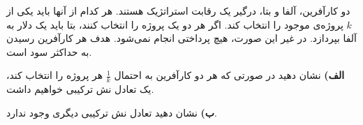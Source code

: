 دو کارآفرین، آلفا و بتا، درگیر یک رقابت استراتژیک هستند. هر کدام از آنها باید یکی از
$k$
پروژه‌ی موجود را انتخاب کند. اگر هر دو یک پروژه را انتخاب کنند، بتا باید یک دلار به آلفا بپردازد. در غیر این صورت، هیچ پرداختی انجام نمی‌شود. هدف هر کارآفرین رسیدن به حداکثر سود است.
\vspace{10pt}

\textbf{الف)}
نشان دهید در صورتی که هر دو کارآفرین به احتمال
$\frac{1}{k}$
هر پروژه را انتخاب کند، یک تعادل نش ترکیبی خواهیم داشت.
\vspace{5pt}

\textbf{ب)}
نشان دهید تعادل نش ترکیبی دیگری وجود ندارد.